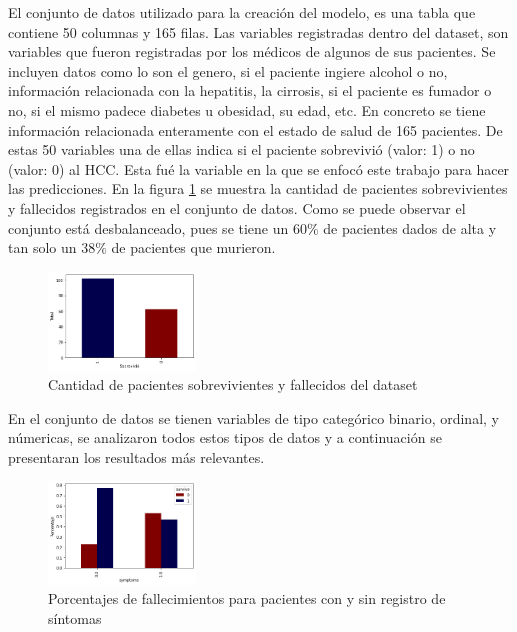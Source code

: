\documentclass[6pt, twocolumn]{article}
\begin{document}
El conjunto de datos utilizado para la creación del modelo, es una tabla que contiene 50 columnas y 165 filas. Las variables registradas dentro del dataset, son variables que fueron 
registradas por los médicos de algunos de sus pacientes. Se incluyen datos como lo son el genero, si el paciente ingiere alcohol o no, información relacionada con la hepatitis, la cirrosis, si el paciente es fumador o no, si el mismo padece diabetes u obesidad, su edad, etc. En concreto se tiene información relacionada enteramente con el estado de salud de 165 pacientes. De estas 50 variables una de ellas indica si el paciente sobrevivió (valor: 1) o no (valor: 0) al HCC. Esta fué la variable en la que se enfocó este trabajo para hacer las predicciones. En la figura \ref{fig:sobrevivio} se muestra la cantidad de pacientes sobrevivientes y fallecidos registrados en el conjunto de datos. Como se puede observar el conjunto está desbalanceado, pues se tiene un $60\%$ de pacientes dados de alta y tan solo un $38\%$ de pacientes que murieron. 
\begin{figure}
\centering
\includegraphics[width = 0.35\textwidth]{./sobrevivio.png}
\caption{\footnotesize \label{fig:sobrevivio}Cantidad de pacientes sobrevivientes y fallecidos del dataset}
\end{figure}
En el conjunto de datos se tienen variables de tipo categórico binario, ordinal, y númericas, se analizaron todos estos tipos de datos y a continuación se presentaran los resultados más relevantes.

\begin{figure}
\centering
\includegraphics[width = 0.35\textwidth]{./sintomas.png}
\caption{\footnotesize \label{fig:synt}Porcentajes de fallecimientos para pacientes con y  sin  registro de síntomas}
\end{figure}
\end{document}
